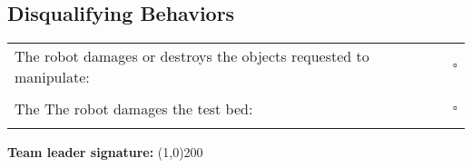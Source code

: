 \subsection*{Disqualifying Behaviors}
\begin{tabular}{ l c}
The robot damages or destroys the objects requested to manipulate: & $\square$ \\ \\
The The robot damages the test bed: & $\square$ \\ \\
\end{tabular}

\vspace{1.5cm}
\begin{large}
\textbf{Team leader signature:}
\line(1,0){200}
\end{large}
